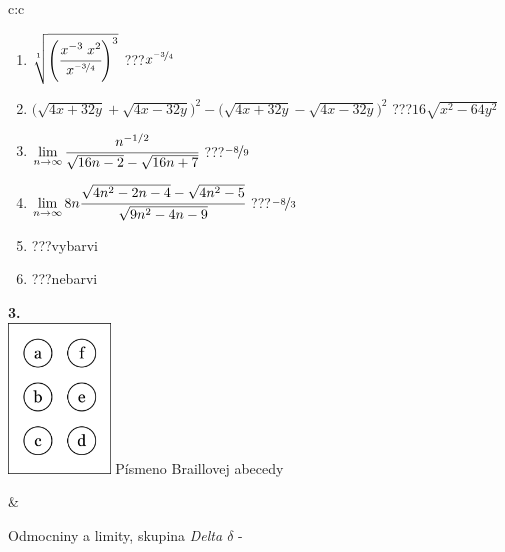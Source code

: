 \documentclass[10pt]{report}
\begin{document}
\begin{tabular}{c:c}
\begin{minipage}[c][104.5mm][t]{0.5\linewidth}
\begin{center}
\begin{minipage}{0.79\linewidth}
\begin{center}
\begin{varwidth}{\linewidth}
\begin{enumerate}
\small
\item $\sqrt[1]{\left(\cfrac{x^{-3}\;x^{2}}{x^{\nicefrac{-3}{4}}}\right)^{3}}$\quad \dotfill\; ???\;\dotfill \quad $x^{\nicefrac{-3}{4}}$
\item {\footnotesize{\scriptsize$\big(\sqrt{4x+32y}+\sqrt{4x-32y}\big)^2-\big(\sqrt{4x+32y}-\sqrt{4x-32y}\big)^2$}\quad \dotfill\; ???\;\dotfill \quad $16\sqrt{x^2-64y^2}$}
\item $\lim\limits_{n\to\infty}\cfrac{n^{-1/2}}{\sqrt{16n-2}-\sqrt{16n+7}}$\quad \dotfill\; ???\;\dotfill \quad $\nicefrac{-8}{9}$
\item $\lim\limits_{n\to\infty}8n\cfrac{\sqrt{4n^2-2n-4}-\sqrt{4n^2-5}}{\sqrt{9n^2-4n-9}}$\quad \dotfill\; ???\;\dotfill \quad $\nicefrac{-8}{3}$
\item \quad \dotfill\; ???\;\dotfill \quad vybarvi
\item \quad \dotfill\; ???\;\dotfill \quad nebarvi
\end{enumerate}
\end{varwidth}
\end{center}
\end{minipage}
\begin{minipage}{0.20\linewidth}
\begin{center}
{\Huge\bfseries 3.} \\[2mm]
\includegraphics[height=40mm]{../images/braille.png}
{\small Písmeno Braillovej abecedy}
\end{center}
\end{minipage}
\end{center}
\end{minipage}
&
\begin{minipage}[c][104.5mm][t]{0.5\linewidth}
\begin{center}
\vspace{7mm}
{\huge Odmocniny a limity, skupina \textit{Delta $\delta$} -}\\[5mm]

\end{center}
\end{minipage}
\end{tabular}
\end{document}
